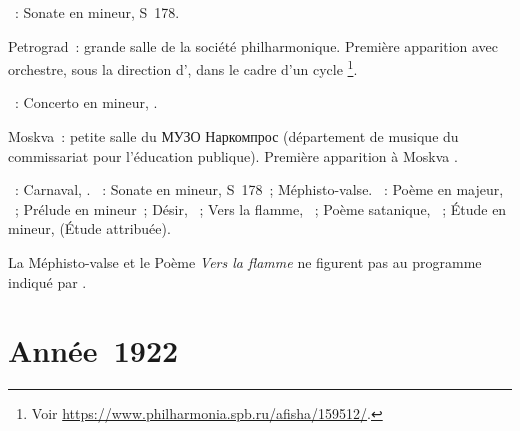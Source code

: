 \begin{description}
 \textsc{\Liszt{}}~: Sonate en \kB mineur, S~178.
 \item[\DateWithWeekDay{1921-07-31}]
 Petrograd~: grande salle de la société philharmonique.
 Première apparition avec orchestre, sous la direction d'\ECooper{}, dans le
 cadre d'un cycle \Scriabine{}%
 \footnote{Voir \href{https://www.philharmonia.spb.ru/afisha/159512/}%
 {https://www.philharmonia.spb.ru/afisha/159512/}.}.

 \textsc{\Scriabine{}}~: Concerto en \kF \Sharp mineur, .
 \item[\DateWithWeekDay{1921-09-10}]
 Moskva~: petite salle du \foreignlanguage{russian}{МУЗО Наркомпрос}
 (département de musique du commissariat pour l'éducation publique).
 Première apparition à Moskva \citep[voir][p.~30]{Sofronitsky82a}.

 \textsc{\Schumann{}}~: Carnaval, .
 \textsc{\Liszt{}}~: Sonate en \kB mineur, S~178~; Méphisto-valse.
 \textsc{\Scriabine{}}~: Poème en \kF \Sharp majeur,  ~;
 Prélude en \kB \Flat mineur~; Désir,  ~; Vers la flamme,
 ~; Poème satanique, ~; Étude en \kD \Sharp mineur,
   (Étude attribuée).

 La Méphisto-valse et le Poème \emph{Vers la flamme} ne figurent pas au
 programme indiqué par \citet[p.~395]{Scriabine}.
\end{description}

\section{Année~1922}

